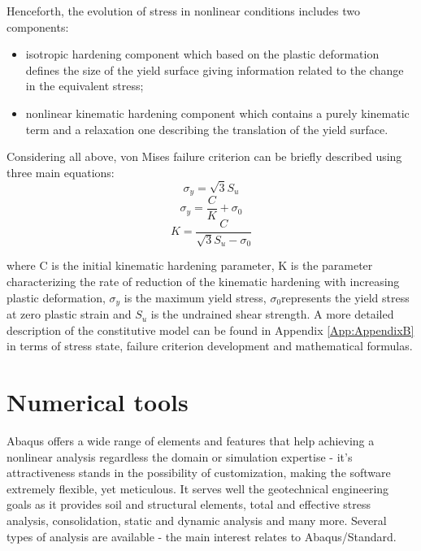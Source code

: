 \documentclass[12pt,a4paper]{report}
\begin{document}
Henceforth, the evolution of stress in nonlinear conditions includes two components:

\begin{itemize}
	\item 	isotropic hardening component which based on the plastic deformation defines the size of the yield surface giving information related to the change in the equivalent stress;
	\item 	nonlinear kinematic hardening component which contains a purely kinematic term and a relaxation one describing the translation of the yield surface.
	\end{itemize}
	
	
	Considering all above, von Mises failure criterion can be briefly described using three main equations:
\begin{equation}
\sigma_y = \sqrt{3}S_u
\end{equation}
\begin{equation}
\sigma_y = \frac{C}{K}+\sigma_0
\end{equation}
\begin{equation}
K=\frac{C}{\sqrt{3}S_u-\sigma_0}
\end{equation}

where C is the initial kinematic hardening parameter, K is the parameter characterizing the rate of reduction of the kinematic hardening with increasing plastic deformation, $\sigma_y$ is the maximum yield stress, $\sigma_0$represents the yield stress at zero plastic strain and $S_u$ is the undrained shear strength. A more detailed description of the constitutive model can be found in Appendix \ref{App:AppendixB} in terms of stress state, failure criterion development and mathematical formulas.

\section{Numerical tools}
Abaqus \cite{hibbett1998abaqus} offers a wide range of elements and features that help achieving a nonlinear analysis regardless the domain or simulation expertise - it's attractiveness stands in the possibility of customization, making the software extremely flexible, yet meticulous. It serves well the geotechnical engineering goals as it provides soil and structural elements, total and effective stress analysis, consolidation, static and dynamic analysis and many more. Several types of analysis are available - the main interest relates to Abaqus/Standard.
\end{document}
